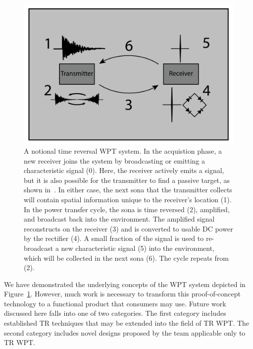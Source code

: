 \begin{figure}[t]
\centering
\includegraphics[width=\columnwidth]{figs/future/WPTSys}
\caption[Proposed Time Reversal System]{A notional time reversal WPT system. In the acquistion phase, a new receiver joins the system by broadcasting or emitting a characteristic signal (0). Here, the receiver actively emits a signal, but it is also possible for the transmitter to find a passive target, as shown in~\cite{nltr-wave-chaotic}. In either case, the next sona that the transmitter collects will contain spatial information unique to the receiver's location (1). In the power transfer cycle, the sona is time reversed (2), amplified, and broadcast back into the environment. The amplified signal reconstructs on the receiver (3) and is converted to usable DC power by the rectifier (4). A small fraction of the signal is used to re-broadcast a new characteristic signal (5) into the environment, which will be collected in the next sona (6). The cycle repeats from (2).}
\label{fig:SysImage}
\end{figure}

We have demonstrated the underlying concepts of the WPT system depicted in Figure~\ref{fig:SysImage}.
However, much work is necessary to transform this proof-of-concept technology to a functional product that consumers may use.
Future work discussed here falls into one of two categories. The first category includes established TR techniques that may be extended into the field of TR WPT.
The second category includes novel designs proposed by the team applicable only to TR WPT.

